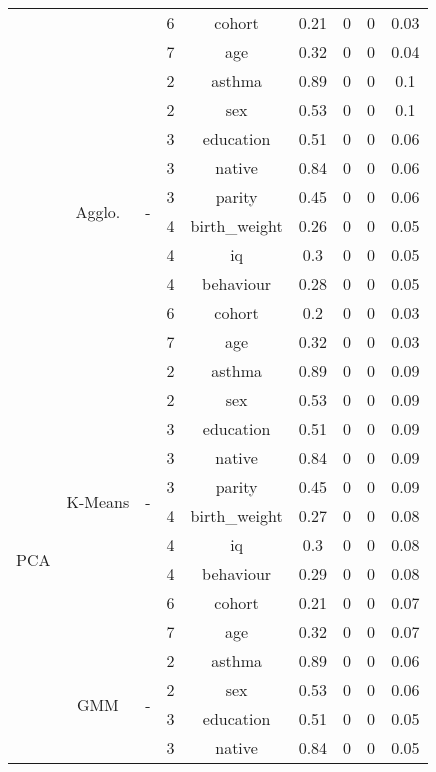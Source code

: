 \documentclass[CAT,BIB]{TFUOC}%
\begin{document}
\begin{table}[p]
\begin{tabular}{@{}ccccccccc@{}}
            &  &  & 6 & cohort & 0.21 & 0 & 0 & 0.03 \\
            &  &  & 7 & age & 0.32 & 0 & 0 & 0.04 \\ \cmidrule(l){2-9}
            & \multirow{10}{*}{Agglo.} & \multirow{10}{*}{-} & 2 & asthma & 0.89 & 0 & 0 & 0.1 \\
            &  &  & 2 & sex & 0.53 & 0 & 0 & 0.1 \\
            &  &  & 3 & education & 0.51 & 0 & 0 & 0.06 \\
            &  &  & 3 & native & 0.84 & 0 & 0 & 0.06 \\
            &  &  & 3 & parity & 0.45 & 0 & 0 & 0.06 \\
            &  &  & 4 & birth\_weight & 0.26 & 0 & 0 & 0.05 \\
            &  &  & 4 & iq & 0.3 & 0 & 0 & 0.05 \\
            &  &  & 4 & behaviour & 0.28 & 0 & 0 & 0.05 \\
            &  &  & 6 & cohort & 0.2 & 0 & 0 & 0.03 \\
            &  &  & 7 & age & 0.32 & 0 & 0 & 0.03 \\ \midrule
            \multirow{30}{*}{PCA} & \multirow{10}{*}{K-Means} & \multirow{10}{*}{-} & 2 & asthma & 0.89 & 0 & 0 & 0.09 \\
            &  &  & 2 & sex & 0.53 & 0 & 0 & 0.09 \\
            &  &  & 3 & education & 0.51 & 0 & 0 & 0.09 \\
            &  &  & 3 & native & 0.84 & 0 & 0 & 0.09 \\
            &  &  & 3 & parity & 0.45 & 0 & 0 & 0.09 \\
            &  &  & 4 & birth\_weight & 0.27 & 0 & 0 & 0.08 \\
            &  &  & 4 & iq & 0.3 & 0 & 0 & 0.08 \\
            &  &  & 4 & behaviour & 0.29 & 0 & 0 & 0.08 \\
            &  &  & 6 & cohort & 0.21 & 0 & 0 & 0.07 \\
            &  &  & 7 & age & 0.32 & 0 & 0 & 0.07 \\ \cmidrule(l){2-9}
            & \multirow{10}{*}{GMM} & \multirow{10}{*}{-} & 2 & asthma & 0.89 & 0 & 0 & 0.06 \\
            &  &  & 2 & sex & 0.53 & 0 & 0 & 0.06 \\
            &  &  & 3 & education & 0.51 & 0 & 0 & 0.05 \\
            &  &  & 3 & native & 0.84 & 0 & 0 & 0.05 \\

\end{tabular}
\end{table}
\end{document}
